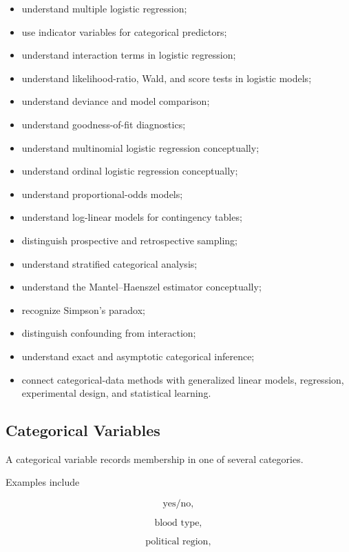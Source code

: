 {\begin{itemize}
    \item understand multiple logistic regression;
    \item use indicator variables for categorical predictors;
    \item understand interaction terms in logistic regression;
    \item understand likelihood-ratio, Wald, and score tests in logistic
          models;
    \item understand deviance and model comparison;
    \item understand goodness-of-fit diagnostics;
    \item understand multinomial logistic regression conceptually;
    \item understand ordinal logistic regression conceptually;
    \item understand proportional-odds models;
    \item understand log-linear models for contingency tables;
    \item distinguish prospective and retrospective sampling;
    \item understand stratified categorical analysis;
    \item understand the Mantel--Haenszel estimator conceptually;
    \item recognize Simpson's paradox;
    \item distinguish confounding from interaction;
    \item understand exact and asymptotic categorical inference;
    \item connect categorical-data methods with generalized linear
          models, regression, experimental design, and statistical
          learning.
\end{itemize}
}

\subsection{Categorical Variables}
\label{subsec:categorical-variables}

A categorical variable records membership in one of several categories.

Examples include

\[
\boxed{
\text{yes/no},
}
\]

\[
\boxed{
\text{blood type},
}
\]

\[
\boxed{
\text{political region},
}
\]

